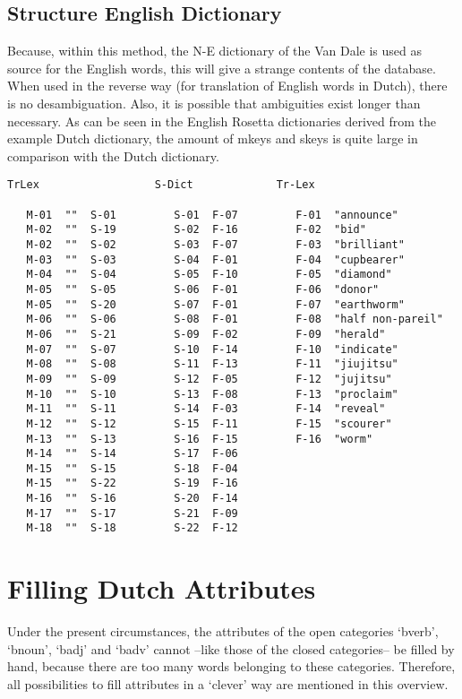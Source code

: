 \subsection{Structure English Dictionary}
Because, within this method, the N-E dictionary of the Van Dale is used 
as source for the English words, this will give a strange contents of the 
database. When used in the reverse way (for translation of English words
in Dutch), there is no
desambiguation. Also, it is possible that ambiguities exist longer than 
necessary. 
As can be seen in the English Rosetta dictionaries derived from the example
Dutch dictionary, the amount of mkeys and skeys is quite large in comparison 
with the Dutch dictionary.

\begin{verbatim}
TrLex                  S-Dict             Tr-Lex

   M-01  ""  S-01         S-01  F-07         F-01  "announce"
   M-02  ""  S-19         S-02  F-16         F-02  "bid"
   M-02  ""  S-02         S-03  F-07         F-03  "brilliant"
   M-03  ""  S-03         S-04  F-01         F-04  "cupbearer"
   M-04  ""  S-04         S-05  F-10         F-05  "diamond"
   M-05  ""  S-05         S-06  F-01         F-06  "donor"
   M-05  ""  S-20         S-07  F-01         F-07  "earthworm"
   M-06  ""  S-06         S-08  F-01         F-08  "half non-pareil"
   M-06  ""  S-21         S-09  F-02         F-09  "herald"
   M-07  ""  S-07         S-10  F-14         F-10  "indicate"
   M-08  ""  S-08         S-11  F-13         F-11  "jiujitsu"
   M-09  ""  S-09         S-12  F-05         F-12  "jujitsu"
   M-10  ""  S-10         S-13  F-08         F-13  "proclaim"
   M-11  ""  S-11         S-14  F-03         F-14  "reveal"
   M-12  ""  S-12         S-15  F-11         F-15  "scourer"
   M-13  ""  S-13         S-16  F-15         F-16  "worm"
   M-14  ""  S-14         S-17  F-06
   M-15  ""  S-15         S-18  F-04
   M-15  ""  S-22         S-19  F-16
   M-16  ""  S-16         S-20  F-14
   M-17  ""  S-17         S-21  F-09
   M-18  ""  S-18         S-22  F-12
\end{verbatim}

\newpage
\section{Filling Dutch Attributes}

Under the present circumstances, the attributes of the open categories `bverb',
`bnoun', `badj' and `badv' cannot 
--like those of the closed categories-- be filled by hand, because there are 
too many words belonging to these categories. Therefore, all possibilities to
fill attributes in a `clever' way are mentioned in this overview. 


